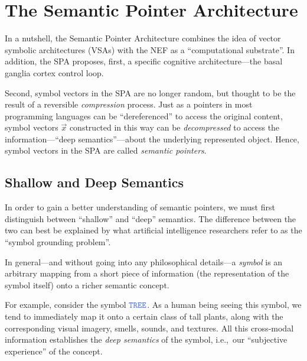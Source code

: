 \documentclass[10pt,letterpaper,oneside]{article}
\newcommand{\Obj}[1]{\ensuremath{\mathtt{\textcolor{RoyalBlue}{#1}}}}
\begin{document}
\section{The Semantic Pointer Architecture}


In a nutshell, the Semantic Pointer Architecture combines the idea of vector symbolic architectures (VSAs) with the NEF as a \enquote{computational substrate}. In addition, the SPA proposes, first, a specific cognitive architecture---the basal ganglia cortex control loop.

Second, symbol vectors in the SPA are no longer random, but thought to be the result of a reversible \emph{compression} process. Just as a pointers in most programming languages can be \enquote{dereferenced} to access the original content, symbol vectors $\vec x$ constructed in this way can be \emph{decompressed} to access the information---\enquote{deep semantics}---about the underlying represented object. Hence, symbol vectors in the SPA are called \emph{semantic pointers}.


\subsection{Shallow and Deep Semantics}

In order to gain a better understanding of semantic pointers, we must first distinguish between \enquote{shallow} and \enquote{deep} semantics. The difference between the two can best be explained by what artificial intelligence researchers refer to as the \enquote{symbol grounding problem}.

In general---and without going into any philosophical details---a \emph{symbol} is an arbitrary mapping from a short piece of information (the representation of the symbol itself) onto a richer semantic concept.

For example, consider the symbol {\Obj{TREE}}. As a human being seeing this symbol, we tend to immediately map it onto a certain class of tall plants, along with the corresponding visual imagery, smells, sounds, and textures. All this cross-modal information establishes the \emph{deep semantics} of the symbol, i.e.,~our \enquote{subjective experience} of the concept.
\end{document}
